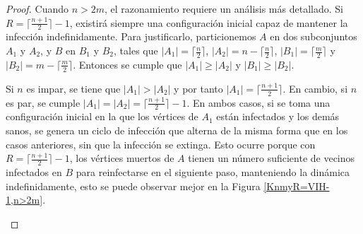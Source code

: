 \documentclass[12pt,titlepage,twoside,openright]{book}
\begin{document}
\begin{proof}
    Cuando $n > 2m$, el razonamiento requiere un an\'alisis m\'as detallado. Si $R = \lceil \tfrac{n+1}{2}\rceil - 1$, existir\'a siempre una configuraci\'on inicial capaz de mantener la infecci\'on indefinidamente. Para justificarlo, particionemos $A$ en dos subconjuntos $A_1$ y $A_2$, y $B$ en $B_1$ y $B_2$, tales que $|A_1| = \lceil \tfrac{n}{2}\rceil$, $|A_2| = n - \lceil \tfrac{n}{2}\rceil$, $|B_1| = \lceil \tfrac{m}{2}\rceil$ y $|B_2| = m - \lceil \tfrac{m}{2}\rceil$. Entonces se cumple que $|A_1|\geq |A_2|$ y $|B_1|\geq |B_2|$. 

    Si $n$ es impar, se tiene que $|A_1| > |A_2|$ y por tanto $|A_1| = \lceil \tfrac{n+1}{2}\rceil$. En cambio, si $n$ es par, se cumple $|A_1| = |A_2| = \lceil \tfrac{n+1}{2}\rceil - 1$. En ambos casos, si se toma una configuraci\'on inicial en la que los v\'ertices de $A_1$ est\'an infectados y los dem\'as sanos, se genera un ciclo de infecci\'on que alterna de la misma forma que en los casos anteriores, sin que la infecci\'on se extinga. Esto ocurre porque con $R = \lceil \tfrac{n+1}{2}\rceil - 1$, los v\'ertices muertos de $A$ tienen un n\'umero suficiente de vecinos infectados en $B$ para reinfectarse en el siguiente paso, manteniendo la din\'amica indefinidamente, esto se puede observar mejor en la Figura \ref{KnmyR=VIH-1,n>2m}. 

    \begin{figure}[h]
    \centering
    \begin{subfigure}[h]{0.85\linewidth}
\end{subfigure}
\end{figure}
\end{proof}
\end{document}
